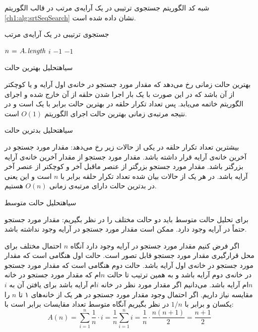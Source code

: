{

شبه کد الگوریتم جستجوی ترتیبی در یک آرایه‌ی مرتب در قالب الگوریتم {\eqref{ch1:alg:srtSeqSearch}} نشان داده شده است.

\begin{algorithm}
\caption{جستجوی ترتیبی در یک آرایه‌ی مرتب}\label{ch1:alg:srtSeqSearch}
\begin{latin}
\begin{algorithmic}[1]
		\State	$n \mathrel{\hspace{1pt}=\hspace{1pt}} A.\hspace*{1pt}\mathit{length}$
						\State	\Return $i$
						\State	\Return $-1$
				\EndIf
		\EndFor
		\State	\Return	$-1$		
\EndFunction
\end{algorithmic}
\end{latin}
\end{algorithm}

‌سیاه{تحلیل بهترین حالت}

بهترین حالت زمانی رخ می‌دهد که مقدار مورد جستجو در خانه‌ی اول آرایه و یا کوچکتر از آن باشد که در این صورت با یک بار اجرا شدن حلقه‌ از آن خارج شده و اجرای الگوریتم خاتمه می‌یابد. پس تعداد تکرار حلقه در بهترین حالت برابر با یک است و در نتیجه مرتبه‌ی زمانی بهترین حالت اجرای الگوریتم {$O(1)$} است.

‌سیاه{تحلیل بدترین حالت}

بیشترین تعداد تکرار حلقه در یکی از حالات زیر رخ می‌دهد:
 مقدار مورد جستجو در آخرین خانه‌ی آرایه قرار داشته باشد.
 مقدار مورد جستجو از مقدار آخرین خانه‌ی آرایه بزرگتر باشد.
 مقدار مورد جستجو بزرگتر از عنصر ماقبل آخر و کوچکتر از عنصر آخر آرایه باشد.
در هر یک از حالات بیان شده تعداد تکرار حلقه برابر با {$n$} است و این یعنی در بدترین حالت دارای مرتبه‌ی زمانی {$O(n)$} هستیم.

‌سیاه{تحلیل حالت متوسط}

برای تحلیل حالت متوسط باید دو حالت مختلف را در نظر بگیریم:
 مقدار مورد جستجو حتماً در آرایه وجود دارد.
 ممکن است مقدار مورد جستجو در آرایه وجود نداشته باشد.

اگر فرض کنیم مقدار مورد جستجو در آرایه‌ وجود دارد آنگاه {$n$} احتمال مختلف برای محل قرارگیری مقدار مورد جستجو قابل تصور است. حالت اول هنگامی است که مقدار مورد جستجو در خانه‌ی اول آرایه باشد. حالت دوم هنگامی است که مقدار مورد جستجو در خانه‌ی دوم آرایه باشد و به همین ترتیب تا حالت {$n$}ام که مقدار مورد جستجو در خانه {$n$}ام آرایه باشد. می‌دانیم اگر مقدار مورد نظر در خانه {$i$}ام آرایه باشد برای یافتن آن به {$i$} مقایسه نیاز داریم. اگر احتمال وجود مقدار مورد جستجو در هر یک از خانه‌های ۱ تا {$n$} را یکسان و برابر با {$1/n$} در نظر بگیریم آنگاه متوسط تعداد مقایسات برابر است با:
\begin{displaymath}
A(n)=\sum_{i=1}^n{\frac{1}{n} \cdot i}=\frac{1}{n} \sum_{i=1}^n{ i}=\frac{1}{n} \cdot \frac{n(n+1)}{2}=\frac{n+1}{2}
\end{displaymath}

}
